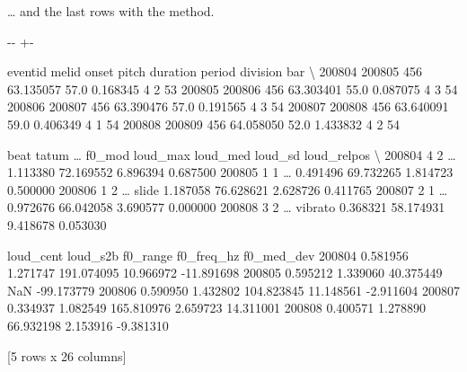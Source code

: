\documentclass[letterpaper,10pt,english]{sphinxmanual}
\newlength\nbsphinxcodecellspacing
\begin{document}
… and the last rows with the  method.

{
\begin{sphinxVerbatim}[commandchars=\\\{\}]
\llap{\color{nbsphinxin}[16]:\,\hspace{\fboxrule}\hspace{\fboxsep}}
\end{sphinxVerbatim}
}

{

\kern-\sphinxverbatimsmallskipamount\kern-\baselineskip
\kern+\FrameHeightAdjust\kern-\fboxrule
\vspace{\nbsphinxcodecellspacing}

\begin{sphinxVerbatim}[commandchars=\\\{\}]
\llap{\color{nbsphinxout}[16]:\,\hspace{\fboxrule}\hspace{\fboxsep}}        eventid  melid      onset  pitch  duration  period  division  bar  \textbackslash{}
200804   200805    456  63.135057   57.0  0.168345       4         2   53
200805   200806    456  63.303401   55.0  0.087075       4         3   54
200806   200807    456  63.390476   57.0  0.191565       4         3   54
200807   200808    456  63.640091   59.0  0.406349       4         1   54
200808   200809    456  64.058050   52.0  1.433832       4         2   54

        beat  tatum  {\ldots}   f0\_mod  loud\_max   loud\_med   loud\_sd  loud\_relpos  \textbackslash{}
200804     4      2  {\ldots}           1.113380  72.169552  6.896394     0.687500
200805     1      1  {\ldots}           0.491496  69.732265  1.814723     0.500000
200806     1      2  {\ldots}    slide  1.187058  76.628621  2.628726     0.411765
200807     2      1  {\ldots}           0.972676  66.042058  3.690577     0.000000
200808     3      2  {\ldots}  vibrato  0.368321  58.174931  9.418678     0.053030

       loud\_cent  loud\_s2b    f0\_range  f0\_freq\_hz  f0\_med\_dev
200804  0.581956  1.271747  191.074095   10.966972  -11.891698
200805  0.595212  1.339060   40.375449         NaN  -99.173779
200806  0.590950  1.432802  104.823845   11.148561   -2.911604
200807  0.334937  1.082549  165.810976    2.659723   14.311001
200808  0.400571  1.278890   66.932198    2.153916   -9.381310

[5 rows x 26 columns]
\end{sphinxVerbatim}
}
\end{document}
